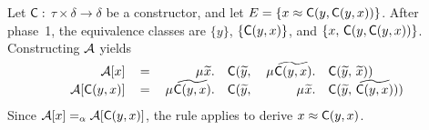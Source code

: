 
\begin{examplex}
Let $\textsf{C} : $ $\tau \times \delta \rightarrow \delta$ be a constructor,
and let $E = \{ x \approx \textsf{C}(y,\textsf{C}(y,x)) \}$.
After phase~1, the equivalence classes %
are
$\{ y \}$, $\{ \textsf{C}(y,x) \}$, and $\{ x,\, \textsf{C}(y,\textsf{C}(y,x)) \}$.
Constructing $\mathcal{A}$ yields
\[\begin{array}{rcrlrl}
\Val \ec{x} & \,=\, &
\MU {\Varec{x}}. & \const{C}( {\Varec{y}},\, & \smash{\MU {\VAREC{\const{C}(y, x)}}}. & \const{C}( {\Varec{y}},\, {\Varec{x}} ) ) \\
\Val \ec{\const{C}(y,x)} & = &
\MU {\VAREC{\const{C}(y,x)}}. & \const{C}( {\Varec{y}},\, & \MU {\Varec{x}}. & \const{C}( {\Varec{y}},\, {\VAREC{\const{C}(y,x)}} ) )
\end{array}\]
Since $\mathcal{A} [x] \mathrel{=_\alpha} \mathcal{A} [\textsf{C}(y,x)]$,
the  rule applies to derive $x \approx \textsf{C}(y,x)$.
\xend
\end{examplex}



